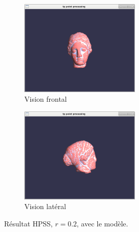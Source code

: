 \documentclass[a4,12pt]{report}
\begin{document}
\begin{figure}[!h]
	\centering
	\begin{subfigure}[b]{0.5\textwidth}
		\centering
		\includegraphics[height=1.8in]{figs/caso2-knn20-frontal-com.png}
		\caption{Vision frontal}
	\end{subfigure}%
	\begin{subfigure}[b]{0.5\textwidth}
		\centering
		\includegraphics[height=1.8in]{figs/caso2-knn20-lateral-com.png}
		\caption{Vision latéral}
	\end{subfigure}
	\label{fig:4}
	\caption{Résultat HPSS, $r=0.2$, avec le modèle.}
\end{figure}
\end{document}
